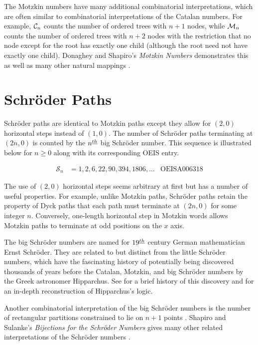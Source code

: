 The Motzkin numbers have many additional combinatorial interpretations, which are often similar to combinatorial interpretations of the Catalan numbers.  For example, $\mathcal{C}_n$ counts the number of ordered trees with $n+1$ nodes, while $\mathcal{M}_n$ counts the number of ordered trees with $n+2$ nodes with the restriction that no node except for the root has exactly one child (although the root need not have exactly one child). Donaghey and Shapiro's \emph{Motzkin Numbers} demonstrates this as well as many other natural mappings \cite{donaghey1977motzkin}.

\section{Schröder Paths}\label{sec:schroder}

Schröder paths are identical to Motzkin paths except they allow for $(2,0)$ horizontal steps instead of $(1,0)$.  The number of Schröder paths terminating at $(2n,0)$ is counted by the $n^{\underline{th}}$ big Schröder number.  This sequence is illustrated below for $n \ge 0$ along with its corresponding OEIS entry.

\begin{align}
\mathcal{S}_n &= 1, 2, 6, 22, 90, 394, 1806, \ldots & \text{OEIS} \text{A}006318
\end{align}

The use of $(2,0)$ horizontal steps seems arbitrary at first but has a number of useful properties.  For example, unlike Motzkin paths, Schröder paths retain the property of Dyck paths that each path must terminate at $(2n,0)$ for some integer $n$.  Conversely, one-length horizontal step in Motzkin words allows Motzkin paths to terminate at odd positions on the $x$ axis.  

The big Schröder numbers are named for $19^{\underline{th}}$ century German mathematician Ernst Schröder.  They are related to but distinct from the little Schröder numbers, which have the fascinating history of potentially being discovered thousands of years before the Catalan, Motzkin, and big Schröder numbers by the Greek astronomer Hipparchus.  See \cite{stanley1997hipparchus} for a brief history of this discovery and \cite{bobzien2011combinatorics} for an in-depth reconstruction of Hipparchus's logic. 

Another combinatorial interpretation of the big Schröder numbers is the number of rectangular partitions constrained to lie on $n+1$ points \cite{ackerman2004number}.  Shapiro and Sulanke's \emph{Bijections for the Schröder Numbers} gives many other related interpretations of the Schröder numbers \cite{shapiro2000bijections}.

